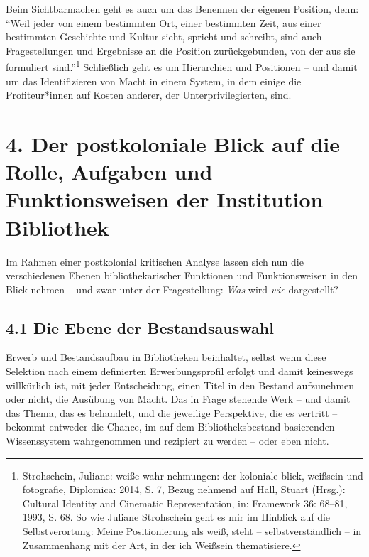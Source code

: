 \documentclass[a4paper,
fontsize=11pt,
oneside,
numbers=noperiodatend,
parskip=half-,
bibliography=totoc,
final
]{scrartcl}
\begin{document}
Beim Sichtbarmachen geht es auch um das Benennen der eigenen Position,
denn: \enquote{Weil jeder von einem bestimmten Ort, einer bestimmten
Zeit, aus einer bestimmten Geschichte und Kultur sieht, spricht und
schreibt, sind auch Fragestellungen und Ergebnisse an die Position
zurückgebunden, von der aus sie formuliert sind.}\footnote{Strohschein,
  Juliane: weiße wahr-nehmungen: der koloniale blick, weißsein und
  fotografie, Diplomica: 2014, S. 7, Bezug nehmend auf Hall, Stuart
  (Hrsg.): Cultural Identity and Cinematic Representation, in: Framework
  36: 68--81, 1993, S. 68. So wie Juliane Strohschein geht es mir im
  Hinblick auf die Selbstverortung: Meine Positionierung als weiß, steht
  -- selbstverständlich -- in Zusammenhang mit der Art, in der ich
  Weißsein thematisiere.} Schließlich geht es um Hierarchien und
Positionen -- und damit um das Identifizieren von Macht in einem System,
in dem einige die Profiteur*innen auf Kosten anderer, der
Unterprivilegierten, sind.

\hypertarget{der-postkoloniale-blick-auf-die-rolle-aufgaben-und-funktionsweisen-der-institution-bibliothek}{%
\section{4. Der postkoloniale Blick auf die Rolle, Aufgaben und
Funktionsweisen der Institution
Bibliothek}\label{der-postkoloniale-blick-auf-die-rolle-aufgaben-und-funktionsweisen-der-institution-bibliothek}}

Im Rahmen einer postkolonial kritischen Analyse lassen sich nun die
verschiedenen Ebenen bibliothekarischer Funktionen und Funktionsweisen
in den Blick nehmen -- und zwar unter der Fragestellung: \emph{Was} wird
\emph{wie} dargestellt?

\hypertarget{die-ebene-der-bestandsauswahl}{%
\subsection{4.1 Die Ebene der
Bestandsauswahl}\label{die-ebene-der-bestandsauswahl}}

Erwerb und Bestandsaufbau in Bibliotheken beinhaltet, selbst wenn diese
Selektion nach einem definierten Erwerbungsprofil erfolgt und damit
keineswegs willkürlich ist, mit jeder Entscheidung, einen Titel in den
Bestand aufzunehmen oder nicht, die Ausübung von Macht. Das in Frage
stehende Werk -- und damit das Thema, das es behandelt, und die
jeweilige Perspektive, die es vertritt -- bekommt entweder die Chance,
im auf dem Bibliotheksbestand basierenden Wissenssystem wahrgenommen und
rezipiert zu werden -- oder eben nicht.
\end{document}

